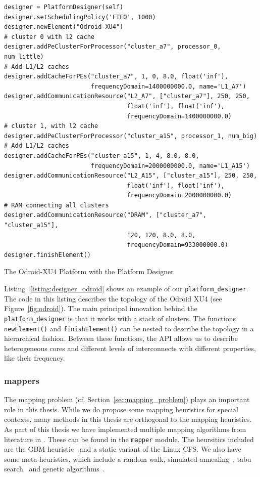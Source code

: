 \begin{listing}
\begin{verbatim}
designer = PlatformDesigner(self)
designer.setSchedulingPolicy('FIFO', 1000)
designer.newElement("Odroid-XU4")
# cluster 0 with l2 cache
designer.addPeClusterForProcessor("cluster_a7", processor_0, num_little)
# Add L1/L2 caches
designer.addCacheForPEs("cluster_a7", 1, 0, 8.0, float('inf'),
                        frequencyDomain=1400000000.0, name='L1_A7')
designer.addCommunicationResource("L2_A7", ["cluster_a7"], 250, 250,
                                  float('inf'), float('inf'),
                                  frequencyDomain=1400000000.0)
# cluster 1, with l2 cache
designer.addPeClusterForProcessor("cluster_a15", processor_1, num_big)
# Add L1/L2 caches
designer.addCacheForPEs("cluster_a15", 1, 4, 8.0, 8.0,
                        frequencyDomain=2000000000.0, name='L1_A15')
designer.addCommunicationResource("L2_A15", ["cluster_a15"], 250, 250,
                                  float('inf'), float('inf'),
                                  frequencyDomain=2000000000.0)
# RAM connecting all clusters
designer.addCommunicationResource("DRAM", ["cluster_a7", "cluster_a15"],
                                  120, 120, 8.0, 8.0,
                                  frequencyDomain=933000000.0)
designer.finishElement()
\end{verbatim}
\caption{The Odroid-XU4 Platform with the Platform Designer}
\label{listing:designer_odroid}
\end{listing}

Listing~\ref{listing:designer_odroid} shows an example of our \texttt{platform\_designer}.
The code in this listing describes the topology of the Odroid XU4 (see Figure~\ref{fig:odroid}). 
The main principal innovation behind the \texttt{platform\_designer} is that it works with a stack of clusters.
The functions \texttt{newElement()} and \texttt{finishElement()} can be nested to describe the topology in a hierarchical fashion.
Between these functions, the \ac{API} allows us to describe heterogeneous cores and different levels of interconnects with different properties, like their frequency.

\subsubsection{mappers}

The mapping problem (cf. Section~\ref{sec:mapping_problem}) plays an important role in this thesis.
While we do propose some mapping heuristics for special contexts, many methods in this thesis are orthogonal to the mapping heuristics.
As part of this thesis we have implemented multiple mapping algorithms from literature in \mocasin.
These can be found in the \texttt{mapper} module. 
The heursitics included are the \ac{GBM} heuristic~\cite{castrillon_dac12} and a static variant of the Linux \ac{CFS}.
We also have some meta-heuristics, which include a random walk, simulated annealing~\cite{simulated_annealing}, tabu search~\cite{tabu_search} and genetic algorithms~\cite{erbas2006multiobjective}. 

